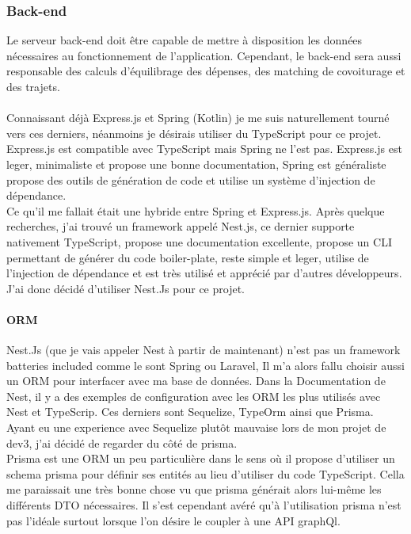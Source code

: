 \subsubsection{Back-end}\label{subsubsec:back-end}
Le serveur back-end doit être capable de mettre à disposition les données nécessaires au fonctionnement de l'application.
Cependant, le back-end sera aussi responsable des calculs d'équilibrage des dépenses, des matching de covoiturage et des trajets.\\\\

Connaissant déjà Express.js et Spring (Kotlin) je me suis naturellement tourné vers ces derniers, néanmoins je désirais utiliser du TypeScript pour ce projet.
Express.js est compatible avec TypeScript mais Spring ne l'est pas.
Express.js est leger, minimaliste et propose une bonne documentation,
Spring est généraliste propose des outils de génération de code et utilise un système d'injection de dépendance.\\

Ce qu'il me fallait était une hybride entre Spring et Express.js.
Après quelque recherches, j'ai trouvé un framework appelé Nest.js, ce dernier supporte nativement TypeScript, propose une documentation excellente,
propose un CLI permettant de générer du code boiler-plate, reste simple et leger, utilise de l'injection de dépendance et est très utilisé et apprécié par d'autres développeurs.
J'ai donc décidé d'utiliser Nest.Js pour ce projet.

\paragraph{ORM}
Nest.Js (que je vais appeler Nest à partir de maintenant) n'est pas un framework batteries included comme le sont Spring ou Laravel,
Il m'a alors fallu choisir aussi un ORM pour interfacer avec ma base de données.
Dans la Documentation de Nest, il y a des exemples de configuration avec les ORM les plus utilisés avec Nest et TypeScrip.
Ces derniers sont Sequelize, TypeOrm ainsi que Prisma.
Ayant eu une experience avec Sequelize plutôt mauvaise lors de mon projet de dev3, j'ai décidé de regarder du côté de prisma.\\

Prisma est une ORM un peu particulière dans le sens où il propose d'utiliser un schema prisma pour définir ses entités au lieu d'utiliser du code TypeScript.
Cella me paraissait une très bonne chose vu que prisma générait alors lui-même les différents DTO nécessaires.
Il s'est cependant avéré qu'à l'utilisation prisma n'est pas l'idéale surtout lorsque l'on désire le coupler à une API graphQl.\\

